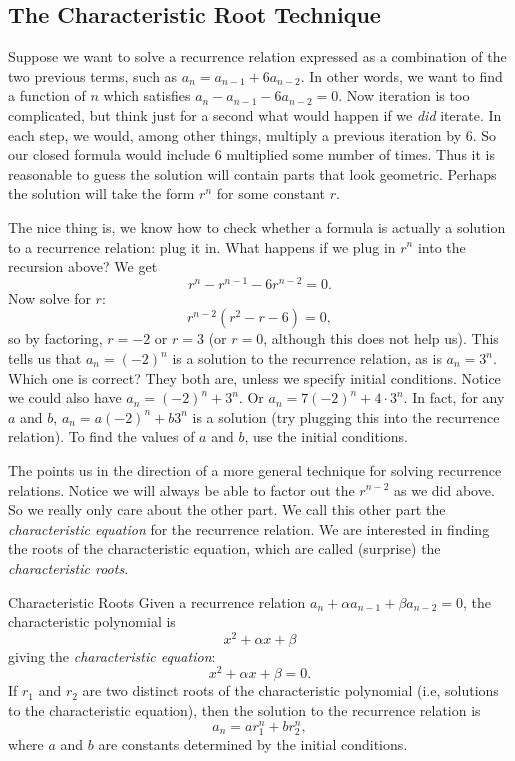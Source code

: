 \documentclass[12pt]{article}
\begin{document}
\subsection{The Characteristic Root Technique}

Suppose we want to solve a recurrence relation expressed as a combination of the two previous terms, such as $a_n = a_{n-1} + 6a_{n-2}$. In other words, we want to find a function of $n$ which satisfies $a_n - a_{n-1} - 6a_{n-2} = 0$.  Now iteration is too complicated, but think just for a second what would happen if we {\em did} iterate.  In each step, we would, among other things, multiply a previous iteration by 6.   So our closed formula would include $6$ multiplied some number of times.  Thus it is reasonable to guess the solution will contain parts that look geometric.  Perhaps the solution will take the form $r^n$ for some constant $r$.
 
The nice thing is, we know how to check whether a formula is actually a solution to a recurrence relation: plug it in.  What happens if we plug in $r^n$ into the recursion above? We get  \[r^n - r^{n-1} - 6r^{n-2} = 0.\]
Now solve for $r$: \[r^{n-2}(r^2 - r - 6) = 0,\]
so by factoring, $r = -2$ or $r = 3$ (or $r = 0$, although this does not help us).  This tells us that $a_n = (-2)^n$ is a solution to the recurrence relation, as is $a_n = 3^n$.  Which one is correct?  They both are, unless we specify initial conditions.  Notice we could also have $a_n = (-2)^n + 3^n$.  Or $a_n = 7(-2)^n + 4\cdot 3^n$.  In fact, for any $a$ and $b$, $a_n = a(-2)^n + b 3^n$ is a solution (try plugging this into the recurrence relation).  To find the values of $a$ and $b$, use the initial conditions.
 
The points us in the direction of a more general technique for solving recurrence relations.  Notice we will always be able to factor out the $r^{n-2}$ as we did above.  So we really only care about the other part.  We call this other part the \emph{characteristic equation} for the recurrence relation.  We are interested in finding the roots of the characteristic equation, which are called (surprise) the \emph{characteristic roots}.  

\clearpage
\begin{defbox}{Characteristic Roots}
 Given a recurrence relation $a_n + \alpha a_{n-1} + \beta a_{n-2} = 0$, the characteristic polynomial is
 \[x^2 + \alpha x + \beta\]
 giving the {\em characteristic equation}:
 \[x^2 + \alpha x + \beta = 0.\]
 If $r_1$ and $r_2$ are two distinct roots of the characteristic polynomial (i.e, solutions to the characteristic equation), then the solution to the recurrence relation is
 \[a_n = ar_1^n + br_2^n,\]
 where $a$ and $b$ are constants determined by the initial conditions.
\end{defbox}
\end{document}
